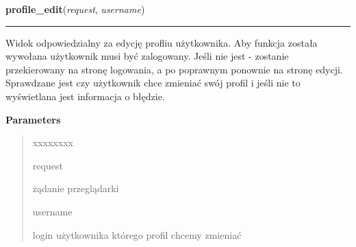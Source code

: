 \hspace{.8\funcindent}\begin{boxedminipage}{\funcwidth}

    \raggedright \textbf{profile\_edit}(\textit{request}, \textit{username})

    \vspace{-1.5ex}

    \rule{\textwidth}{0.5\fboxrule}
\setlength{\parskip}{2ex}
    Widok odpowiedzialny za edycję profliu użytkownika. Aby funkcja została
    wywołana użytkownik musi być zalogowany. Jeśli nie jest - zostanie 
    przekierowany na stronę logowania, a po poprawnym ponownie na stronę 
    edycji. Sprawdzane jest czy użytkownik chce zmieniać swój profil i 
    jeśli nie to wyświetlana jest informacja o błędzie.

\setlength{\parskip}{1ex}
      \textbf{Parameters}
      \vspace{-1ex}

      \begin{quote}
        \begin{Ventry}{xxxxxxxx}

          \item[request]

          żądanie przeglądarki

          \item[username]

          login użytkownika którego profil chcemy zmieniać

        \end{Ventry}

      \end{quote}

    \end{boxedminipage}

    \label{ass8_portal:accounts:views:profile_save}

    \vspace{0.5ex}

